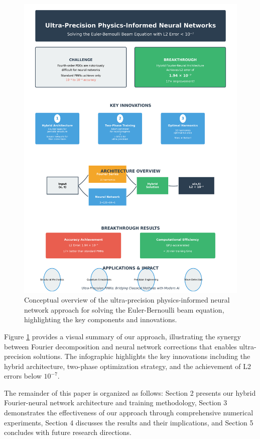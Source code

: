\begin{figure}[ht]
    \centering
    \includegraphics[width = 1.0\linewidth]{figures/infographic.png}
    \caption{Conceptual overview of the ultra-precision physics-informed neural network approach for solving the Euler-Bernoulli beam equation, highlighting the key components and innovations.}
    \label{fig:infographic}
\end{figure}

Figure \ref{fig:infographic} provides a visual summary of our approach, illustrating the synergy between Fourier decomposition and neural network corrections that enables ultra-precision solutions. The infographic highlights the key innovations including the hybrid architecture, two-phase optimization strategy, and the achievement of L2 errors below $10^{-7}$.

The remainder of this paper is organized as follows: Section 2 presents our hybrid Fourier-neural network architecture and training methodology, Section 3 demonstrates the effectiveness of our approach through comprehensive numerical experiments, Section 4 discusses the results and their implications, and Section 5 concludes with future research directions.

